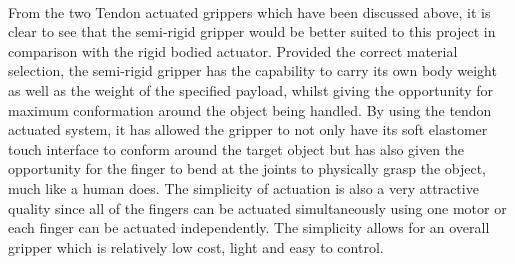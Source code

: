 \documentclass[11pt,twocolumn]{article}
\begin{document}
\\
From the two Tendon actuated grippers which have been discussed above, it is clear to see that the semi-rigid gripper would be better suited to this project in comparison with the rigid bodied actuator. Provided the correct material selection, the semi-rigid gripper has the capability to carry its own body weight as well as the weight of the specified payload, whilst giving the opportunity for maximum conformation around the object being handled. By using the tendon actuated system, it has allowed the gripper to not only have its soft elastomer touch interface to conform around the target object but has also given the opportunity for the finger to bend at the joints to physically grasp the object, much like a human does. The simplicity of actuation is also a very attractive quality since all of the fingers can be actuated simultaneously using one motor or each finger can be actuated independently. The simplicity allows for an overall gripper which is relatively low cost, light and easy to control.
\end{document}
